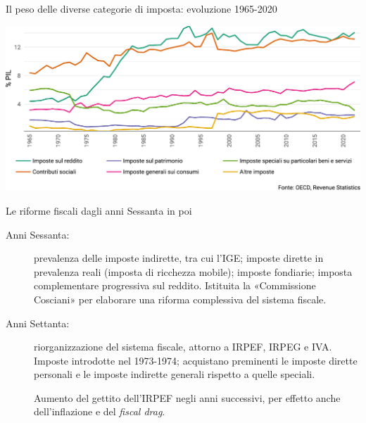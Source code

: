 \documentclass[aspectratio=64,12pt]{beamer}
\begin{document}
\begin{frame}{Il peso delle diverse categorie di imposta: evoluzione 1965-2020}
\begin{center}
\includegraphics[width=\textwidth]{./figure/evoluzione-struttura-imposte-ITA-2022-color.pdf}
\end{center}
\end{frame}

\begin{frame}{Le riforme fiscali dagli anni Sessanta in poi}
  \begin{description}
  \item[Anni Sessanta:] prevalenza delle imposte indirette, tra cui l'IGE; imposte dirette in prevalenza reali (imposta di ricchezza mobile); imposte fondiarie; imposta complementare progressiva sul reddito.
\smallskip
    Istituita la «Commissione Cosciani» per elaborare una riforma complessiva del sistema fiscale.
    
  \item[Anni Settanta:] riorganizzazione del sistema fiscale, attorno a IRPEF,
    IRPEG e IVA. Imposte introdotte nel 1973-1974; acquistano preminenti le
    imposte dirette personali e le imposte indirette generali rispetto a
    quelle speciali.

    Aumento del gettito dell'IRPEF negli anni successivi, per effetto anche
    dell'inflazione e del \emph{fiscal drag}.
  \end{description}
\end{frame}
\end{document}
